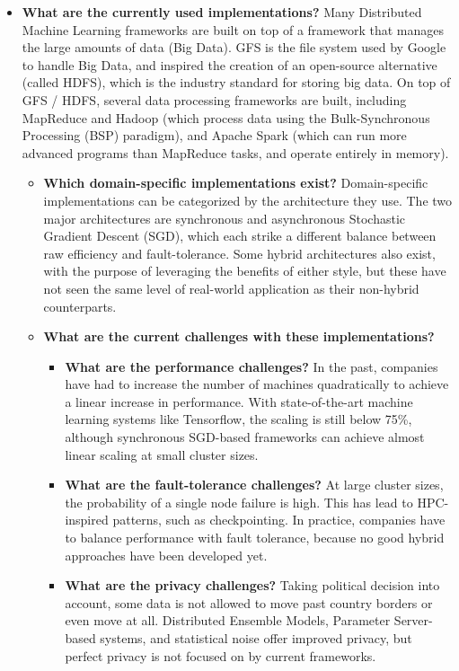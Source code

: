 \begin{itemize}
	\item \textbf{What are the currently used implementations?} Many Distributed Machine Learning frameworks are built on top of a framework that manages the large amounts of data (Big Data). GFS is the file system used by Google to handle Big Data, and inspired the creation of an open-source alternative (called HDFS), which is the industry standard for storing big data. On top of GFS / HDFS, several data processing frameworks are built, including MapReduce and Hadoop (which process data using the Bulk-Synchronous Processing (BSP) paradigm), and Apache Spark (which can run more advanced programs than MapReduce tasks, and operate entirely in memory).
	\begin{itemize}
		\item \textbf{Which domain-specific implementations exist?}
		Domain-specific implementations can be categorized by the architecture they use. The two major architectures are synchronous and asynchronous Stochastic Gradient Descent (SGD), which each strike a different balance between raw efficiency and fault-tolerance. Some hybrid architectures also exist, with the purpose of leveraging the benefits of either style, but these have not seen the same level of real-world application as their non-hybrid counterparts.
		\item \textbf{What are the current challenges with these implementations?}
		\begin{itemize}
			\item \textbf{What are the performance challenges?} In the past, companies have had to increase the number of machines quadratically to achieve a linear increase in performance. With state-of-the-art machine learning systems like Tensorflow, the scaling is still below 75\%, although synchronous SGD-based frameworks can achieve almost linear scaling at small cluster sizes.
			\item \textbf{What are the fault-tolerance challenges?} At large cluster sizes, the probability of a single node failure is high. This has lead to HPC-inspired patterns, such as checkpointing. In practice, companies have to balance performance with fault tolerance, because no good hybrid approaches have been developed yet.
			\item \textbf{What are the privacy challenges?} Taking political decision into account, some data is not allowed to move past country borders or even move at all. Distributed Ensemble Models, Parameter Server-based systems, and statistical noise offer improved privacy, but perfect privacy is not focused on by current frameworks.
		\end{itemize}
	\end{itemize}
\end{itemize}
